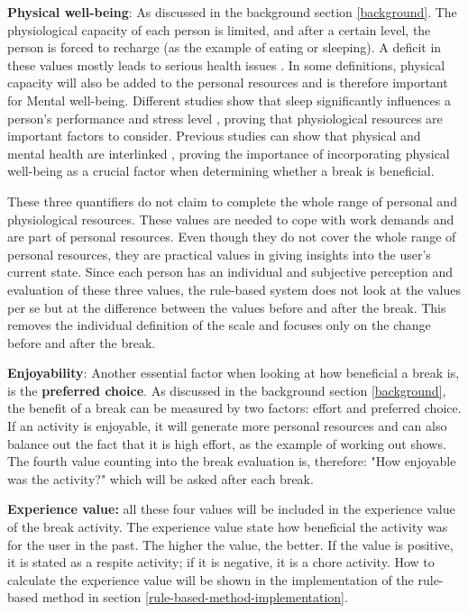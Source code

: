 \documentclass{hasel_thesis}
\begin{document}
\textbf{Physical well-being}: As discussed in the background section \ref{background}. The physiological capacity of each person is limited, and after a certain level, the person is forced to recharge (as the example of eating or sleeping). A deficit in these values mostly leads to serious health issues \cite{Trougakos.2009}. In some definitions, physical capacity will also be added to the personal resources and is therefore important for Mental well-being. Different studies show that sleep significantly influences a person's performance and stress level \cite{Rosekind.2010, Choi.2018}, proving that physiological resources are important factors to consider. Previous studies can show that physical and mental health are interlinked \cite{Doan.2022}, proving the importance of incorporating physical well-being as a crucial factor when determining whether a break is beneficial. 

These three quantifiers do not claim to complete the whole range of personal and physiological resources. These values are needed to cope with work demands and are part of personal resources. Even though they do not cover the whole range of personal resources, they are practical values in giving insights into the user's current state. Since each person has an individual and subjective perception and evaluation of these three values, the rule-based system does not look at the values per se but at the difference between the values before and after the break. This removes the individual definition of the scale and focuses only on the change before and after the break. 

\textbf{Enjoyability}: Another essential factor when looking at how beneficial a break is, is the \textbf{preferred choice}. As discussed in the background section \ref{background}, the benefit of a break can be measured by two factors: effort and preferred choice. If an activity is enjoyable, it will generate more personal resources and can also balance out the fact that it is high effort, as the example of working out shows. The fourth value counting into the break evaluation is, therefore: "How enjoyable was the activity?" which will be asked after each break.

\textbf{Experience value:} all these four values will be included in the experience value of the break activity. The experience value state how beneficial the activity was for the user in the past. The higher the value, the better. If the value is positive, it is stated as a respite activity; if it is negative, it is a chore activity. How to calculate the experience value will be shown in the implementation of the rule-based method in section \ref{rule-based-method-implementation}.
\end{document}
